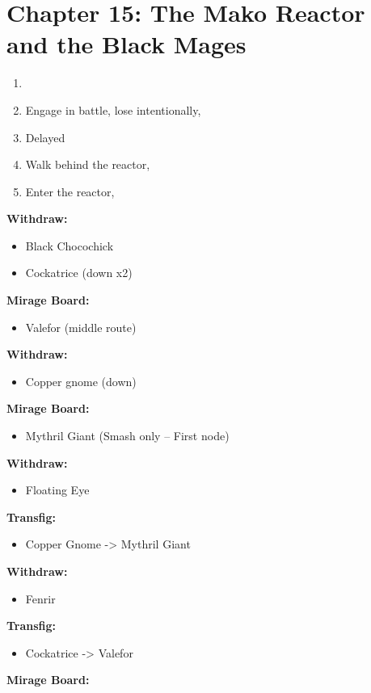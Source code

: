 \chapter{Chapter 15: The Mako Reactor and the Black Mages}
\begin{enumerate}
    \item \cs\
    \item Engage in battle, lose intentionally, \cs\
    \item Delayed \cs\
    \item Walk behind the reactor, 
    \item Enter the reactor, \cs\
\end{enumerate}

\begin{menu}
\textbf{Withdraw:}
    \begin{itemize}
        \item Black Chocochick
        \item Cockatrice (down x2)
    \end{itemize}
\textbf{Mirage Board:}
    \begin{itemize}
        \item Valefor (middle route)
    \end{itemize}
\textbf{Withdraw:}
    \begin{itemize}
        \item Copper gnome (down)
    \end{itemize}
\textbf{Mirage Board:}
    \begin{itemize}
        \item Mythril Giant (Smash only -- First node)
    \end{itemize}
\textbf{Withdraw:}
    \begin{itemize}
        \item Floating Eye
    \end{itemize}
\textbf{Transfig:}
    \begin{itemize}
        \item Copper Gnome -> Mythril Giant
    \end{itemize}
\textbf{Withdraw:}
    \begin{itemize}
        \item Fenrir
    \end{itemize}
\textbf{Transfig:}
    \begin{itemize}
        \item Cockatrice -> Valefor
    \end{itemize}
\textbf{Mirage Board:}

\end{menu}
